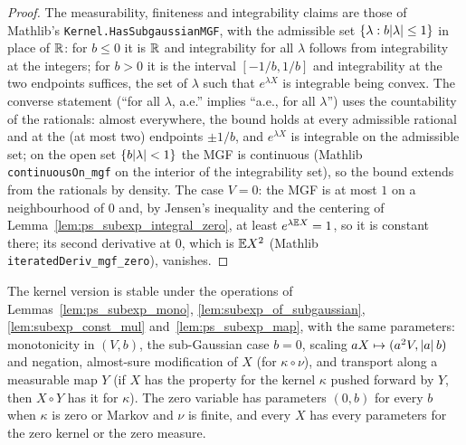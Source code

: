 \begin{proof}
\leanok
{}
The measurability, finiteness and integrability claims are those of Mathlib's
\texttt{Kernel.HasSubgaussianMGF}, with the admissible set $\{\lambda : b\lvert \lambda \rvert\le1\}$
in place of $\mathbb{R}$: for $b \le 0$ it is $\mathbb{R}$ and integrability for all $\lambda$ follows from
integrability at the integers; for $b > 0$ it is the interval $[-1/b, 1/b]$ and integrability
at the two endpoints suffices, the set of $\lambda$ such that $e^{\lambda X}$ is integrable
being convex. The converse statement (``for all $\lambda$, a.e.'' implies ``a.e., for all
$\lambda$'') uses the countability of the rationals: almost everywhere, the bound holds at
every admissible rational and at the (at most two) endpoints $\pm1/b$, and $e^{\lambda X}$ is
integrable on the admissible set; on the open set $\{b\lvert \lambda \rvert < 1\}$ the MGF is continuous
(Mathlib \texttt{continuousOn\_mgf} on the interior of the integrability set), so the bound
extends from the rationals by density. The case $V = 0$: the MGF is at most $1$ on a
neighbourhood of $0$ and, by Jensen's inequality and the centering of
Lemma~\ref{lem:ps_subexp_integral_zero}, at least $e^{\lambda\mathbb{E} X} = 1$, so it is constant
there; its second derivative at $0$, which is $\mathbb{E} X^2$ (Mathlib
\texttt{iteratedDeriv\_mgf\_zero}), vanishes.
\end{proof}

\begin{lemma}\label{lem:subexp_kernel_stability}
\leanok
{}
The kernel version is stable under the operations of Lemmas~\ref{lem:ps_subexp_mono},
\ref{lem:subexp_of_subgaussian}, \ref{lem:subexp_const_mul} and~\ref{lem:ps_subexp_map}, with
the same parameters: monotonicity in $(V,b)$, the sub-Gaussian case $b = 0$, scaling
$aX \mapsto (a^2V, \lvert a \rvert\,b)$ and negation, almost-sure modification of $X$ (for
$\kappa\circ\nu$), and transport along a measurable map $Y$ (if $X$ has the property for the
kernel $\kappa$ pushed forward by $Y$, then $X\circ Y$ has it for $\kappa$). The zero variable
has parameters $(0, b)$ for every $b$ when $\kappa$ is zero or Markov and $\nu$ is finite, and
every $X$ has every parameters for the zero kernel or the zero measure.
\end{lemma}

